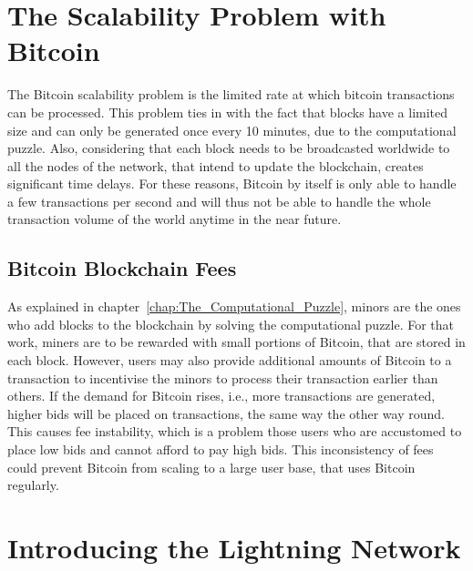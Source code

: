 \documentclass[a4paper, 12pt]{report}
\begin{document}
\chapter{The Scalability Problem with Bitcoin}

\par The Bitcoin scalability problem is the limited rate at which bitcoin transactions can be processed. This problem ties in with the fact that blocks have a limited size and can only be generated once every 10 minutes, due to the computational puzzle. Also, considering that each block needs to be broadcasted worldwide to all the nodes of the network, that intend to update the blockchain, creates significant time delays. For these reasons, Bitcoin by itself is only able to handle a few transactions per second and will thus not be able to handle the whole transaction volume of the world anytime in the near future.\cite{joseph}

\section{Bitcoin Blockchain Fees}

\par As explained in chapter~\ref{chap:The_Computational_Puzzle}, minors are the ones who add blocks to the blockchain by solving the computational puzzle. For that work, miners are to be rewarded with small portions of Bitcoin, that are stored in each block. However, users may also provide additional amounts of Bitcoin to a transaction to incentivise the minors to process their transaction earlier than others. If the demand for Bitcoin rises, i.e., more transactions are generated, higher bids will be placed on transactions, the same way the other way round. This causes fee instability, which is a problem those users who are accustomed to place low bids and cannot afford to pay high bids. This inconsistency of fees could prevent Bitcoin from scaling to a large user base, that uses Bitcoin regularly.\cite{daniel}

\chapter{Introducing the Lightning Network}
\end{document}
